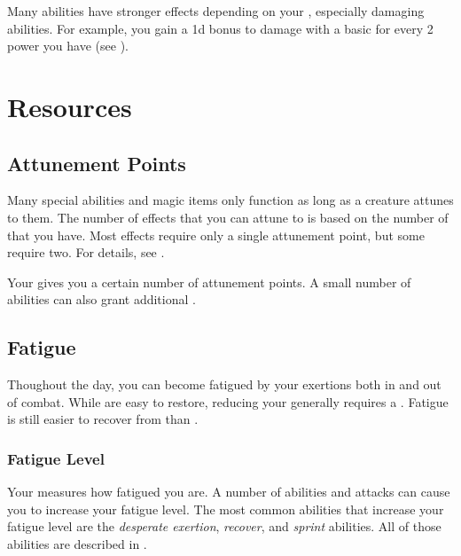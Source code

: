         Many abilities have stronger effects depending on your , especially damaging abilities.
        For example, you gain a \plus1d bonus to damage with a basic  for every 2 power you have (see ).

\section{Resources}\label{Resources}

    \subsection{Attunement Points}\label{Attunement Points}
        Many special abilities and magic items only function as long as a creature attunes to them.
        The number of effects that you can attune to is based on the number of  that you have.
        Most effects require only a single attunement point, but some require two.
        For details, see .

        Your  gives you a certain number of attunement points.
        A small number of abilities can also grant additional .

    \subsection{Fatigue}\label{Fatigue}
        Thoughout the day, you can become fatigued by your exertions both in and out of combat.
        While  are easy to restore, reducing your  generally requires a .
        Fatigue is still easier to recover from than .

        \subsubsection{Fatigue Level}\label{Fatigue Level}
            Your  measures how fatigued you are.
            A number of abilities and attacks can cause you to increase your fatigue level.
            The most common abilities that increase your fatigue level are the \textit{desperate exertion}, \textit{recover}, and \textit{sprint} abilities.
            All of those abilities are described in .

